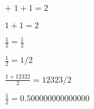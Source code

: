 $+$
$1+1 = 2$

$1+1 = 2$

$\frac{1}{2} = \frac{1}{2}$

$\frac{1}{2} = 1/2$

$\frac{1+12322}{2} = 12323/2$

$\frac{1}{2} = 0.500000000000000$
